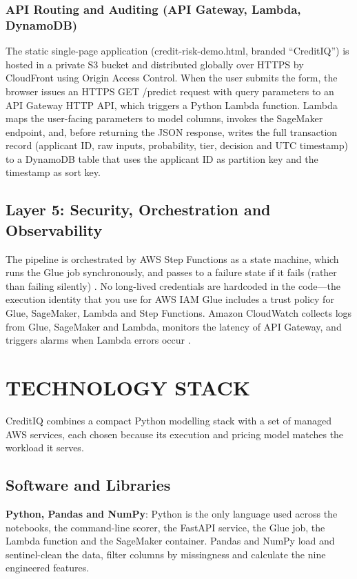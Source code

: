 \documentclass[conference]{IEEEtran}
\begin{document}
\subsubsection{API Routing and Auditing (API Gateway, Lambda, DynamoDB)}
The static single-page application (credit-risk-demo.html, branded ``CreditIQ'') is hosted in a private S3 bucket and distributed globally over HTTPS by CloudFront using Origin Access Control. When the user submits the form, the browser issues an HTTPS GET /predict request with query parameters to an API Gateway HTTP API, which triggers a Python Lambda function. Lambda maps the user-facing parameters to model columns, invokes the SageMaker endpoint, and, before returning the JSON response, writes the full transaction record (applicant ID, raw inputs, probability, tier, decision and UTC timestamp) to a DynamoDB table that uses the applicant ID as partition key and the timestamp as sort key.

\subsection{Layer 5: Security, Orchestration and Observability}
The pipeline is orchestrated by AWS Step Functions as a state machine, which runs the Glue job synchronously, and passes to a failure state if it fails (rather than failing silently) \cite{14}. No long-lived credentials are hardcoded in the code---the execution identity that you use for AWS IAM Glue includes a trust policy for Glue, SageMaker, Lambda and Step Functions. Amazon CloudWatch collects logs from Glue, SageMaker and Lambda, monitors the latency of API Gateway, and triggers alarms when Lambda errors occur \cite{15}.

\section{TECHNOLOGY STACK}
CreditIQ combines a compact Python modelling stack with a set of managed AWS services, each chosen because its execution and pricing model matches the workload it serves.

\subsection{Software and Libraries}
\textbf{Python, Pandas and NumPy}: Python is the only language used across the notebooks, the command-line scorer, the FastAPI service, the Glue job, the Lambda function and the SageMaker container. Pandas and NumPy load and sentinel-clean the data, filter columns by missingness and calculate the nine engineered features.
\end{document}
